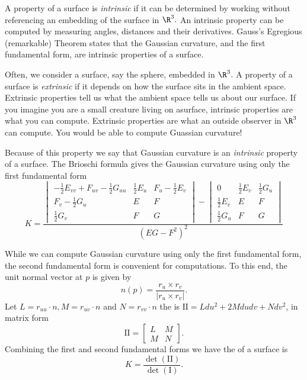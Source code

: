 A property of a surface is \emph{intrinsic} if it can be determined by working without referencing
an embedding of the surface in $\R^3.$ An intrinsic property can be computed by measuring angles,
distances and their derivatives.
Gauss's Egregious (remarkable) Theorem states that the Gaussian curvature, and the first fundamental form, are intrinsic properties of a surface.

Often, we consider a surface, say the sphere, embedded in $\R^3.$ A property of a surface is
\emph{extrinsic} if it depends on how the surface sits in the ambient space. Extrinsic properties
tell us what the ambient space tells us about our surface. If you imagine you are a small
creature living on asurface, intrinsic properties are what you can compute. Extrinsic properties
are what an outside observer in $\R^3$ can compute. You would be able to compute Guassian
curvature!



Because of this property we say that Gaussian curvature is an \emph{intrinsic} property of a surface.
The Brioschi formula gives the Gaussian curvature using only the first fundamental form
\begin{equation}\label{eq:brioschi}
	K=\frac{\begin{vmatrix}
-\frac{1}{2}E_{vv}+F_{uv}-\frac{1}{2}G_{uu} & \frac{1}{2}E_u & F_u-\frac{1}{2}E_v\\
F_v-\frac{1}{2}G_u & E & F\\
\frac{1}{2}G_v & F & G
\end{vmatrix}-\begin{vmatrix}
0 & \frac{1}{2}E_v & \frac{1}{2}G_u\\
\frac{1}{2}E_v & E & F\\
\frac{1}{2}G_u & F & G
\end{vmatrix}}{(EG-F^2)^2}
\end{equation}



While we can compute Gaussian curvature using only the first fundamental form,
 the second fundamental form is convenient for computations.
To this end, the unit normal vector at $p$ is given by $$n(p)=\frac{r_u\times r_v}{|r_u\times r_v|}.$$
Let $L=r_{uu}\cdot n, M=r_{uv}\cdot n$ and $N=r_{vv}\cdot n$ the
 is $\mathrm{I\!I}=Ldu^2+2Mdudv+Ndv^2$,
in matrix form $$\mathrm{I\!I}=\begin{bmatrix}
L & M \\
M & N 
\end{bmatrix}.$$
Combining the first and second fundamental forms we have
the  of a surface is
\begin{equation}\label{eqn:curve-dets}
 	K=\frac{\det(\mathrm{I\!I})}{\det(\mathrm{I})}.
\end{equation}

